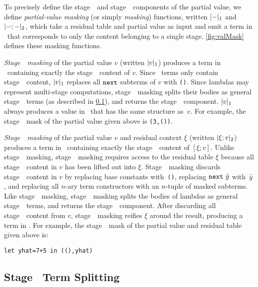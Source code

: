 To precisely define the stage~\bbone\ and stage~\bbtwo\ components of the partial value, we define 
\emph{partial-value masking} (or simply {\em masking}) functions, written $|{-}|_{ 1}$ and $|{-};{-}|_{ 2}$, 
which take a residual table and partial value as input and emit a term in \langmono\
that corresponds to only the content belonging to a single stage. \ref{fig:valMask} defines these
masking functions.

\emph{Stage~\bbone\ masking} of the partial value $v$ (written $|v|_{ 1}$) produces a term in \langmono\ containing exactly
the stage~\bbone\ content of $v$. Since \next\ terms only contain stage~\bbtwo\
content, $|v|_{ 1}$ replaces all ${\tt next}$ subterms of $v$ with \texttt{()}.  Since lambdas may represent multi-stage computations, stage~\bbone\ masking splits their bodies as general stage~\bbone\ terms (as described in \ref{sec:split-one}), and returns
the stage~\bbone\ component. $|v|_{ 1}$ always produces a value in \langmono\ that has
the same structure as~$v$.  For example, the stage~\bbone\ mask of the partial value given above is \texttt{(3,())}. 

\emph{Stage~\bbtwo\ masking} of the partial value $v$ and residual context $\xi$ (written $|\xi;v|_{ 2}$) produces a term in \langmono\ containing
exactly the stage~\bbtwo\ content of $[\xi;v]$. Unlike stage~\bbone\ masking, stage~\bbtwo\ masking 
requires access to the residual table $\xi$ because all stage~\bbtwo\
content in $v$ has been lifted out into $\xi$. Stage~\bbtwo\ masking discards
stage~\bbone\ content in $v$ by replacing base constants with~\texttt{()},
replacing ${\tt next}~\hat{y}$ with~$\hat{y}$, and replacing all $n$-ary term
constructors with an $n$-tuple of masked subterms. Like stage~\bbone\ masking, stage~\bbtwo\
masking splits the bodies of lambdas as general stage~\bbone\ terms, and
returns the stage~\bbtwo\ component. After discarding all stage~\bbone\ content from $v$, stage~\bbtwo\ masking reifies $\xi$ around the result,
producing a term in \langmono. For example, the stage~\bbtwo\ mask of the partial value and residual table given above is:
\begin{lstlisting}
let yhat=7+5 in ((),yhat)
\end{lstlisting}

\subsection{Stage \bbone\ Term Splitting}
\label{sec:split-one}

